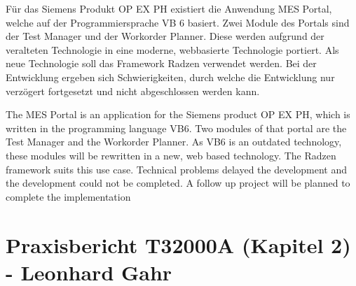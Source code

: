 \documentclass[
ngerman, %
a4paper, %
12pt,
pdftex,
disable %
]{report}
\newenvironment{abstractpage}
{\cleardoublepage\vspace*{\fill}\thispagestyle{empty}}
{\vfill\cleardoublepage}
\newenvironment{myabstract}[1]
{\bigskip\selectlanguage{#1}
\begin{center}
    \bfseries\abstractname
\end{center}}
{\par\bigskip}
\begin{document}
\begin{abstractpage}
  \begin{myabstract}{german}
    Für das Siemens Produkt \gls{OP EX PH} existiert die Anwendung MES Portal, welche auf der Programmiersprache \gls{VB} 6 basiert. Zwei Module des Portals sind der Test Manager und der Workorder Planner. Diese werden aufgrund der veralteten Technologie in eine moderne, webbasierte Technologie portiert. Als neue Technologie soll das Framework Radzen verwendet werden. Bei der Entwicklung ergeben sich Schwierigkeiten, durch welche die Entwicklung nur verzögert fortgesetzt und nicht abgeschlossen werden kann.
  \end{myabstract}

  \begin{myabstract}{english}
    The MES Portal is an application for the Siemens product \gls{OP EX PH}, which is written in the programming language \gls{VB}6. Two modules of that portal are the Test Manager and the Workorder Planner. As \gls{VB}6 is an outdated technology, these modules will be rewritten in a new, web based technology. The Radzen framework suits this use case. Technical problems delayed the development and the development could not be completed. A follow up project will be planned to complete the implementation
  \end{myabstract}
\end{abstractpage}

\tableofcontents
\listoftables
\listoffigures
\lstlistoflistings

\printnoidxglossary[type=main, title={Glossar}]
\printnoidxglossary[type=\acronymtype, title={Abkürzungsverzeichnis}]








\clearpage
\appendix
\chapter{Praxisbericht T3\textunderscore 2000A (Kapitel 2) - Leonhard Gahr}\label{appendix_T2000_gahr}

\clearpage

\cleardoublepage{}
\def\refname{Literaturverzeichnis}
\printbibliography

\newpage
\listoftodos
\end{document}
